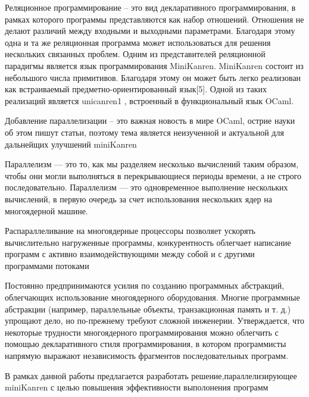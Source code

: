 

Реляционное программирование – это вид декларативного программирования, в рамках которого программы представляются как набор
отношений. Отношения не делают различий между входными и выходными параметрами. Благодаря этому одна и та же реляционная
программа может использоваться для решения нескольких связанных
проблем. Одним из представителей реляционной парадигмы является
язык программирования MiniKanren. MiniKanren состоит из небольшого числа примитивов. Благодаря этому он может быть легко реализован как встраиваемый предметно-ориентированный язык[5]. Одной из
таких реализаций является unicanren1
, встроенный в функциональный
язык OCaml.

Добавление параллелизации -- это важная новость в мире OCaml, острие науки об этом пишут статьи,
поэтому тема является неизученной и актуальной для дальнейщих улучшений miniKanren

Параллелизм — это то, как мы разделяем несколько вычислений таким образом, чтобы они могли выполняться в перекрывающиеся периоды времени, а не строго последовательно. Параллелизм — это одновременное выполнение нескольких вычислений, в первую очередь за счет использования нескольких ядер на многоядерной машине.  

Распараллеливание на многоядерные процессоры позволяет ускорять вычислительно нагруженные программы, конкурентность облегчает написание программ с активно взаимодействующими между собой и с другими программами потоками

Постоянно предпринимаются усилия по созданию программных абстракций, облегчающих использование многоядерного оборудования. Многие программные абстракции (например, параллельные объекты, транзакционная память и т. д.) упрощают дело, но по-прежнему требуют сложной инженерии. Утверждается, что некоторые трудности многоядерного программирования можно облегчить с помощью декларативного стиля программирования, в котором программисты напрямую выражают независимость фрагментов последовательных программ.

В рамках данной работы предлагается разработать решение,параллелизирующее miniKanren с целью повышения эффективности выполонения программ
